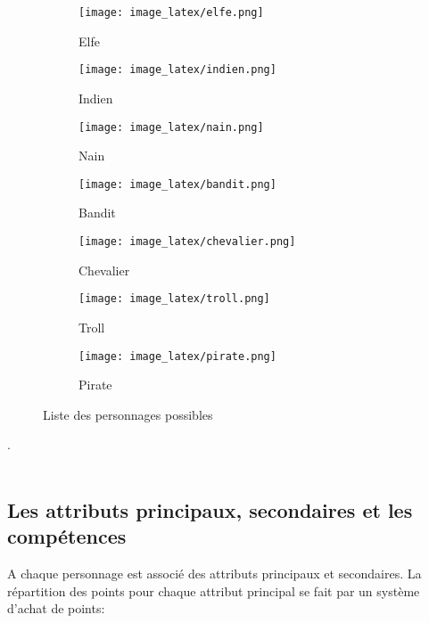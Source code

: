\documentclass[a4paper,12pt]{report}
\begin{document}
	
	
	
	
	\begin{figure*}[h]
		\centering
		\begin{subfigure}[b]{0.2\linewidth}
			\centering
			\texttt{[image: image\_latex/elfe.png]}
			\caption{Elfe} 
		\end{subfigure}
		\begin{subfigure}[b]{0.2\linewidth}
			\centering
			\texttt{[image: image\_latex/indien.png]}
			\caption{Indien}
		\end{subfigure}
		\begin{subfigure}[b]{0.2\linewidth}
			\centering
			\texttt{[image: image\_latex/nain.png]}
			\caption{Nain}
		\end{subfigure}
		
		
		\begin{subfigure}[b]{0.2\linewidth}
			\centering
			\texttt{[image: image\_latex/bandit.png]}
			\caption{Bandit} 
		\end{subfigure}
		\begin{subfigure}[b]{0.2\linewidth}
			\centering
			\texttt{[image: image\_latex/chevalier.png]}
			\caption{Chevalier}
		\end{subfigure}
		\begin{subfigure}[b]{0.2\linewidth}
			\centering
			\texttt{[image: image\_latex/troll.png]}
			\caption{Troll}
		\end{subfigure}
		
		
		\begin{subfigure}[b]{0.2\linewidth}
			\centering
			\texttt{[image: image\_latex/pirate.png]}
			\caption{Pirate}
		\end{subfigure}

		\caption{Liste des personnages possibles}
	\end{figure*}



	. \\ \\ 
	
	\subsection{Les attributs principaux, secondaires et les compétences}
	

	\indent A chaque personnage est associé des attributs principaux et secondaires. La répartition des points pour chaque attribut principal se fait par un système d'achat de points:  
\end{document}
